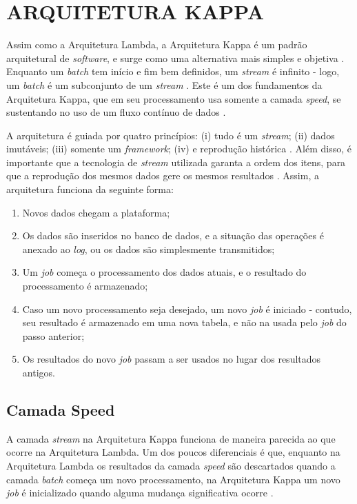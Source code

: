 \section{ARQUITETURA KAPPA}

Assim como a Arquitetura Lambda, a Arquitetura Kappa é um padrão arquitetural
de \textit{software}, e surge como uma alternativa mais simples e objetiva
\cite{kreps2014}. Enquanto um \textit{batch} tem início e fim bem definidos,
um \textit{stream} é infinito - logo, um \textit{batch} é um subconjunto de
um \textit{stream} \cite{seyvet2016}. Este é um dos fundamentos da Arquitetura
Kappa, que em seu processamento usa somente a camada \textit{speed}, se
sustentando no uso de um fluxo contínuo de dados \cite{kreps2014}.

A arquitetura é guiada por quatro princípios: (i) tudo é um \textit{stream};
(ii) dados imutáveis; (iii) somente um \textit{framework};
(iv) e reprodução histórica \cite{seyvet2016}. Além disso, é importante que
a tecnologia de \textit{stream} utilizada garanta a ordem dos itens, para
que a reprodução dos mesmos dados gere os mesmos resultados \cite{seyvet2016}.
Assim, a arquitetura funciona da seguinte forma:

\begin{enumerate}
    \item Novos dados chegam a plataforma;
    \item Os dados são inseridos no banco de dados, e a situação das operações
        é anexado ao \textit{log}, ou os dados são simplesmente transmitidos;
    \item Um \textit{job} começa o processamento dos dados atuais, e o
        resultado do processamento é armazenado;
    \item Caso um novo processamento seja desejado, um novo \textit{job}
        é iniciado - contudo, seu resultado é armazenado em uma nova tabela,
        e não na usada pelo \textit{job} do passo anterior;
    \item Os resultados do novo \textit{job} passam a ser usados no lugar
        dos resultados antigos.
\end{enumerate}

\subsection{Camada Speed}

A camada \textit{stream} na Arquitetura Kappa funciona de maneira parecida ao
que ocorre na Arquitetura Lambda. Um dos poucos diferenciais é que, enquanto
na Arquitetura Lambda os resultados da camada \textit{speed} são descartados
quando a camada \textit{batch} começa um novo processamento, na Arquitetura
Kappa um novo \textit{job} é inicializado quando alguma mudança significativa
ocorre \cite{forgeat2015}.

